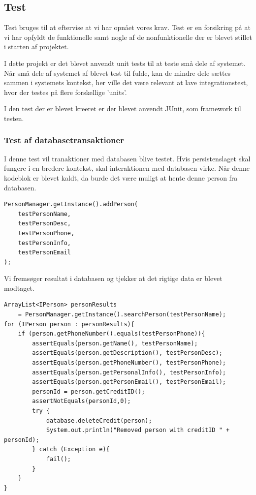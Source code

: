 \newpage
\subsection{Test}

Test bruges til at eftervise at vi har opnået vores krav. Test er en forsikring
på at vi har opfyldt de funktionelle samt nogle af de nonfunktionelle der er
blevet stillet i starten af projektet.

I dette projekt er det blevet anvendt unit tests til at teste små dele af
systemet. Når små dele af systemet af blevet test til fulde, kan de mindre dele
sættes sammen i systemets kontekst, her ville det være relevant at lave
integrationstest, hvor der testes på flere forskellige 'units'.

I den test der er blevet kreeret er der blevet anvendt JUnit, som framework til
testen.

\subsubsection{Test af databasetransaktioner}%
\label{ssub:test_af_database_transaktioner}

I denne test vil tranaktioner med databasen blive testet. Hvis
persistenslaget skal fungere i en bredere kontekst, skal interaktionen med
databasen virke. Når denne kodeblok er blevet kaldt, da burde det være muligt at
hente denne person fra databasen.

\begin{lstlisting}
PersonManager.getInstance().addPerson(
    testPersonName,
    testPersonDesc,
    testPersonPhone,
    testPersonInfo,
    testPersonEmail
);
\end{lstlisting}

Vi fremsøger resultat i databasen og tjekker at det rigtige data er blevet
modtaget.

\begin{lstlisting}
ArrayList<IPerson> personResults 
    = PersonManager.getInstance().searchPerson(testPersonName);
for (IPerson person : personResults){
    if (person.getPhoneNumber().equals(testPersonPhone)){
        assertEquals(person.getName(), testPersonName);
        assertEquals(person.getDescription(), testPersonDesc);
        assertEquals(person.getPhoneNumber(), testPersonPhone);
        assertEquals(person.getPersonalInfo(), testPersonInfo);
        assertEquals(person.getPersonEmail(), testPersonEmail);
        personId = person.getCreditID();
        assertNotEquals(personId,0);
        try {
            database.deleteCredit(person);
            System.out.println("Removed person with creditID " + personId);
        } catch (Exception e){
            fail();
        }
    }
}
\end{lstlisting}

